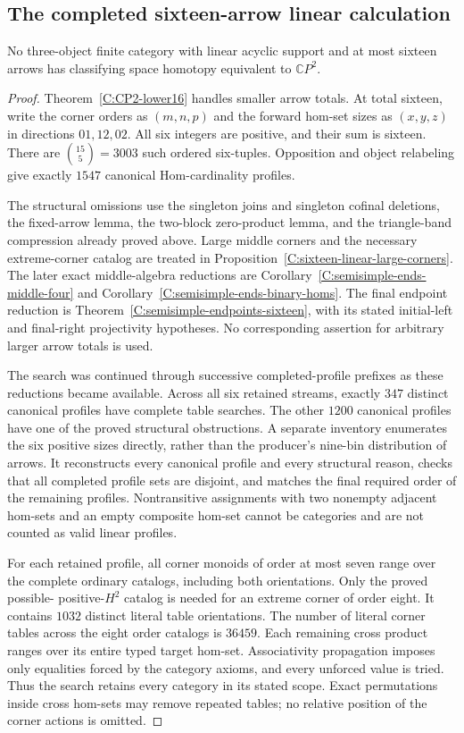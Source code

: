 \subsection{The completed sixteen-arrow linear calculation}

\begin{theorem}\label{C:sixteen-three-linear}
No three-object finite category with linear acyclic support
and at most sixteen arrows has classifying space homotopy
equivalent to $\mathbb CP^2$.
\end{theorem}
\begin{proof}
Theorem~\ref{C:CP2-lower16} handles smaller arrow totals.
At total sixteen, write the corner orders as $(m,n,p)$
and the forward hom-set sizes as $(x,y,z)$ in directions
$01,12,02$.  All six integers are positive, and their sum
is sixteen.  There are $\binom{15}{5}=3003$ such ordered
six-tuples.  Opposition and object relabeling give exactly
$1547$ canonical Hom-cardinality profiles.

The structural omissions use the singleton joins and
singleton cofinal deletions, the fixed-arrow lemma, the
two-block zero-product lemma, and the triangle-band
compression already proved above.  Large middle corners
and the necessary extreme-corner catalog are treated in
Proposition~\ref{C:sixteen-linear-large-corners}.
The later exact middle-algebra reductions are
Corollary~\ref{C:semisimple-ends-middle-four} and
Corollary~\ref{C:semisimple-ends-binary-homs}.
The final endpoint reduction is
Theorem~\ref{C:semisimple-endpoints-sixteen}, with its
stated initial-left and final-right projectivity hypotheses.
No corresponding assertion for arbitrary larger arrow
totals is used.

The search was continued through successive completed-profile
prefixes as these reductions became available.  Across all
six retained streams, exactly $347$ distinct canonical
profiles have complete table searches.  The other $1200$
canonical profiles have one of the proved structural
obstructions.  A separate inventory enumerates the six
positive sizes directly, rather than the producer's
nine-bin distribution of arrows.  It reconstructs every
canonical profile and every structural reason, checks
that all completed profile sets are disjoint, and matches
the final required order of the remaining profiles.
Nontransitive assignments with two nonempty adjacent
hom-sets and an empty composite hom-set cannot be categories
and are not counted as valid linear profiles.

For each retained profile, all corner monoids of order at
most seven range over the complete ordinary catalogs,
including both orientations.  Only the proved possible-
positive-$H^2$ catalog is needed for an extreme corner of
order eight.  It contains $1032$ distinct literal table
orientations.  The number of literal corner tables across
the eight order catalogs is $36459$.
Each remaining cross product ranges over its entire typed
target hom-set.  Associativity propagation imposes only
equalities forced by the category axioms, and every
unforced value is tried.  Thus the search retains every
category in its stated scope.  Exact permutations inside
cross hom-sets may remove repeated tables; no relative
position of the corner actions is omitted.


\end{proof}
